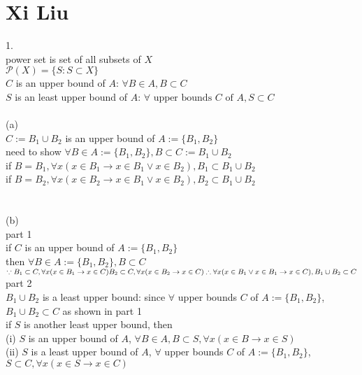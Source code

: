 \documentclass[12pt, border = 4pt, multi]{article} %
\begin{document}
\section*{Xi Liu}
1.\\
power set is set of all subsets of $X$\\
$\mathcal{P}(X) = \{S: S \subset X\}$\\
$C$ is an upper bound of $A$: $\forall B \in A, B \subset C$\\
$S$ is an least upper bound of $A$: $\forall \text{ upper bounds } C \text{ of } A, S \subset C$\\
\\
(a)\\
$C := B_1 \cup B_2$ is an upper bound of $A := \{B_1, B_2\}$\\
need to show $\forall B \in A := \{B_1, B_2\}, B \subset C := B_1 \cup B_2$\\
if $B = B_1, \forall x (x \in B_1 \rightarrow x \in B_1 \vee x \in B_2), B_1 \subset B_1 \cup B_2$\\
if $B = B_2, \forall x (x \in B_2 \rightarrow x \in B_1 \vee x \in B_2), B_2 \subset B_1 \cup B_2$\\
\\
\\
(b)\\
part 1\\
if $C$ is an upper bound of $A := \{B_1, B_2\}$\\
then $\forall B \in A := \{B_1, B_2\}, B \subset C$\\
$\because B_1 \subset C, \forall x(x \in B_1 \rightarrow x \in C)\\
B_2 \subset C, \forall x(x \in B_2 \rightarrow x \in C)\\
\therefore \forall x(x \in B_1 \vee x \in B_1 \rightarrow x \in C), B_1 \cup B_2 \subset C\\$
\\
part 2\\
$B_1 \cup B_2$ is a least upper bound: since $\forall$ upper bounds $C$ of $A := \{B_1, B_2\}$, $B_1 \cup B_2 \subset C$ as shown in part 1\\
if $S$ is another least upper bound, then\\
(i) $S$ is an upper bound of $A$, $\forall B \in A, B \subset S, \forall x (x \in B \rightarrow x \in S)$\\
(ii) $S$ is a least upper bound of $A$, $\forall$ upper bounds $C$ of $A := \{B_1, B_2\}$, $S \subset C, \forall x (x \in S \rightarrow x \in C)$\\
\end{document}
